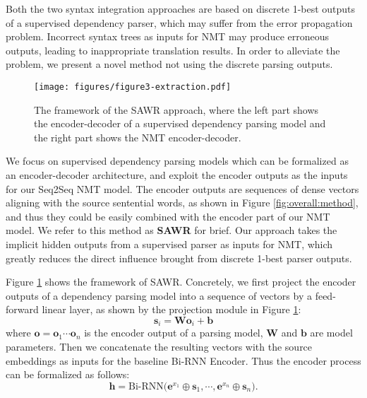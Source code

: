 \documentclass[11pt,a4paper]{article}
\begin{document}
\begin{CJK}{UTF8}{gbsn}
Both the two syntax integration approaches are based on discrete 1-best outputs of a supervised dependency parser,
which may suffer from the error propagation problem.
Incorrect syntax trees as inputs for NMT may produce erroneous outputs,
leading to inappropriate translation results.
In order to alleviate the problem,
we present a novel method not using the discrete parsing outputs.


\begin{figure}[tb]
	\centerline{\texttt{[image: figures/figure3-extraction.pdf]}}
	\caption{The framework of the SAWR approach, where the left part shows the encoder-decoder of a supervised dependency parsing model and the right part shows the NMT encoder-decoder.  }\label{model-extractor}
\end{figure}



We focus on supervised dependency parsing models which can be formalized as an encoder-decoder architecture,
and exploit the encoder outputs as the inputs for our Seq2Seq NMT model.
The encoder outputs are sequences of dense vectors aligning with the source sentential words,
as shown in Figure \ref{fig:overall:method},
and thus they could be easily combined with the encoder part of our NMT model.
We refer to this method as \textbf{SAWR} for brief.
Our approach takes the implicit hidden outputs from a supervised parser as inputs for NMT,
which greatly reduces the direct influence brought from discrete 1-best parser outputs.





Figure \ref{model-extractor} shows the framework of SAWR.
Concretely, we first project the encoder outputs of a dependency parsing model
into a sequence of vectors by a feed-forward linear layer,
as shown by the projection module in Figure \ref{model-extractor}:
\begin{equation}\label{hidden-project}
 \bm{s}_i =  \bm{W}\bm{o}_i  + \bm{b}
\end{equation}
where $\bm{o} \text{$=$} \bm{o}_1 \cdots\bm{o}_n$ is the encoder output of a parsing model,
$\bm{W}$ and $\bm{b}$ are model parameters.
Then we concatenate the resulting vectors with the source embeddings as inputs for the baseline Bi-RNN Encoder.
Thus the encoder process can be formalized as follows:
\begin{equation}\label{hidden-combine}
\bm{h} = \text{Bi-RNN} \big( \bm{e}^{x_1}\oplus\bm{s}_1,
\cdots,  \bm{e}^{x_n}\oplus\bm{s}_n\big).
\end{equation}


\end{CJK}
\end{document}
